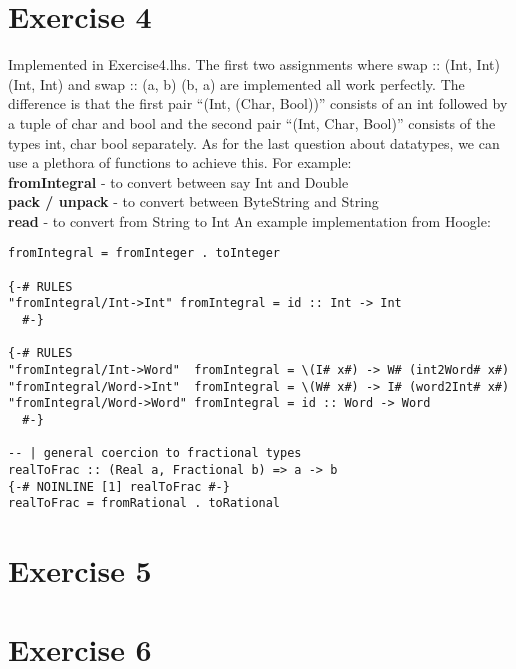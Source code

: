 \documentclass{article}
\begin{document}
\section*{Exercise 4}
Implemented in Exercise4.lhs.
The first two assignments where swap :: (Int, Int) (Int, Int) and swap :: (a, b)  (b, a) are implemented all work perfectly.
\newline
\newline
The difference is that the first pair ``(Int, (Char, Bool))'' consists of an int followed by a tuple of char and bool and the second pair ``(Int, Char, Bool)'' consists of the types int, char bool separately.
As for  the last question about datatypes, we can use a plethora of functions to achieve this. For example: \\
\textbf{fromIntegral} - to convert between say Int and Double\\
\textbf{pack / unpack} - to convert between ByteString and String\\
\textbf{read} - to convert from String to Int
\newline
An example implementation from Hoogle:
\begin{lstlisting}
fromIntegral = fromInteger . toInteger

{-# RULES
"fromIntegral/Int->Int" fromIntegral = id :: Int -> Int
  #-}

{-# RULES
"fromIntegral/Int->Word"  fromIntegral = \(I# x#) -> W# (int2Word# x#)
"fromIntegral/Word->Int"  fromIntegral = \(W# x#) -> I# (word2Int# x#)
"fromIntegral/Word->Word" fromIntegral = id :: Word -> Word
  #-}

-- | general coercion to fractional types
realToFrac :: (Real a, Fractional b) => a -> b
{-# NOINLINE [1] realToFrac #-}
realToFrac = fromRational . toRational
\end{lstlisting}


\section*{Exercise 5}


\section*{Exercise 6}
\end{document}
